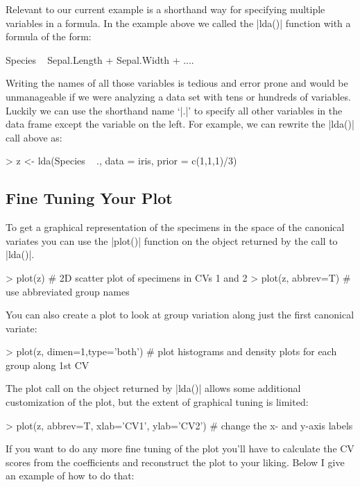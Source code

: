 Relevant to our current example is a shorthand way for specifying multiple variables in a formula. In the example above we called the |lda()| function with a formula of the form: 
\begin{Code}
Species ~ Sepal.Length + Sepal.Width + ....
\end{Code}

Writing the names of all those variables is tedious and error prone and would be unmanageable if we were analyzing a data set with tens or hundreds of variables. Luckily we can use the shorthand name `|.|' to specify all other variables in the data frame except the variable on the left.  For example, we can rewrite the |lda()| call above as:

\begin{Code}
> z <- lda(Species ~ ., data = iris, prior = c(1,1,1)/3)
\end{Code}

\subsection*{Fine Tuning Your Plot}

To get a graphical representation of the specimens in the space of the canonical variates you can use the |plot()| function on the object returned by the call to |lda()|.

\begin{Code}
> plot(z) # 2D scatter plot of specimens in CVs 1 and 2
> plot(z, abbrev=T) # use abbreviated group names
\end{Code}

You can also create a plot to look at group variation along just the first canonical variate:

\begin{Code}
> plot(z, dimen=1,type='both') # plot histograms and density plots for each group along 1st CV 
\end{Code}


The plot call on the object returned by |lda()| allows some additional customization of the plot, but the extent of graphical tuning is limited:

\begin{Code}
> plot(z, abbrev=T, xlab='CV1', ylab='CV2') # change the x- and y-axis labels
\end{Code}

If you want to do any more fine tuning of the plot you'll have to calculate the CV scores from the coefficients and reconstruct the plot to your liking. Below I give an example of how to do that:

